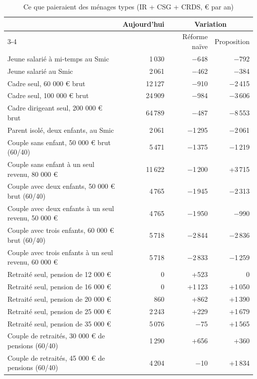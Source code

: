 \begin{table}[!htbp]\centering\scriptsize\setlength{\tabcolsep}{4pt}
\caption{Ce que paieraient des ménages types (IR + CSG + CRDS, € par an)}\label{tab:ircsg_cas}
\begin{tabular}{@{}lrrr@{}}
\toprule
& Aujourd'hui & \multicolumn{2}{c}{Variation} \\ \cmidrule(l){3-4}
& & Réforme naïve & Proposition \\
\midrule
Jeune salarié à mi-temps au Smic & 1\,030 & $-$648 & $-$792 \\
Jeune salarié au Smic & 2\,061 & $-$462 & $-$384 \\
Cadre seul, 60 000 € brut & 12\,127 & $-$910 & $-$2\,415 \\
Cadre seul, 100 000 € brut & 24\,909 & $-$984 & $-$3\,606 \\
Cadre dirigeant seul, 200 000 € brut & 64\,789 & $-$487 & $-$8\,553 \\
Parent isolé, deux enfants, au Smic & 2\,061 & $-$1\,295 & $-$2\,061 \\
Couple sans enfant, 50 000 € brut (60/40) & 5\,471 & $-$1\,375 & $-$1\,219 \\
Couple sans enfant à un seul revenu, 80 000 € & 11\,622 & $-$1\,200 & +3\,715 \\
Couple avec deux enfants, 50 000 € brut (60/40) & 4\,765 & $-$1\,945 & $-$2\,313 \\
Couple avec deux enfants à un seul revenu, 50 000 € & 4\,765 & $-$1\,950 & $-$990 \\
Couple avec trois enfants, 60 000 € brut (60/40) & 5\,718 & $-$2\,844 & $-$2\,836 \\
Couple avec trois enfants à un seul revenu, 60 000 € & 5\,718 & $-$2\,833 & $-$1\,259 \\
Retraité seul, pension de 12 000 € & 0 & +523 & 0 \\
Retraité seul, pension de 16 000 € & 0 & +1\,123 & +1\,050 \\
Retraité seul, pension de 20 000 € & 860 & +862 & +1\,390 \\
Retraité seul, pension de 25 000 € & 2\,243 & +229 & +1\,679 \\
Retraité seul, pension de 35 000 € & 5\,076 & $-$75 & +1\,565 \\
Couple de retraités, 30 000 € de pensions (60/40) & 1\,290 & +656 & +360 \\
Couple de retraités, 45 000 € de pensions (60/40) & 4\,204 & $-$10 & +1\,834 \\
\bottomrule
\end{tabular}

\end{table}
